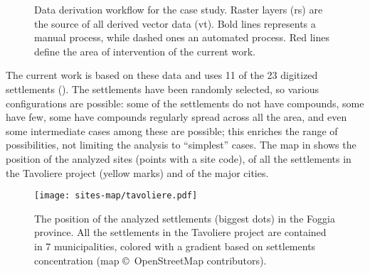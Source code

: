             \begin{figure}[H]
                \caption[Data deriving workflow for the Tavoliere project]{Data derivation workflow for the case study. Raster layers (\textsf{rs}) are the source of all derived vector data (\textsf{vt}). Bold lines represents a manual process, while dashed ones an automated process. Red lines define the area of intervention of the current work.}
                \label{fig:scheme-derive}
            \end{figure}

            The current work is based on these data and uses 11 of the 23 digitized settlements (). The settlements have been randomly selected, so various configurations are possible: some of the settlements do not have compounds, some have few, some have compounds regularly spread across all the area, and even some intermediate cases among these are possible; this enriches the range of possibilities, not limiting the analysis to ``simplest'' cases. The map in  shows the position of the analyzed sites (points with a site code), of all the settlements in the Tavoliere project (yellow marks) and of the major cities.
            

            \begin{figure}[H]
                \texttt{[image: sites-map/tavoliere.pdf]}
                \caption[Analyzed settlments positions in Foggia province]{The position of the analyzed settlements (biggest dots) in the Foggia province. All the settlements in the Tavoliere project are contained in 7 municipalities, colored with a gradient based on settlements concentration (map \copyright~OpenStreetMap contributors).}
                \label{fig:sites-map}
            \end{figure}


